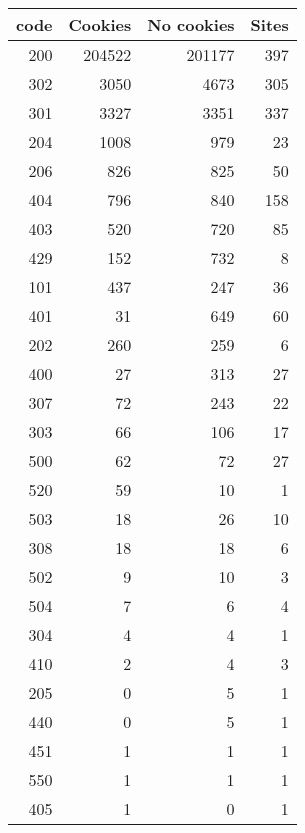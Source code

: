 \begin{tabular}{rrrr}
\toprule
 code &  Cookies &  No cookies &  Sites \\
\midrule
  200 &   204522 &      201177 &    397 \\
  302 &     3050 &        4673 &    305 \\
  301 &     3327 &        3351 &    337 \\
  204 &     1008 &         979 &     23 \\
  206 &      826 &         825 &     50 \\
  404 &      796 &         840 &    158 \\
  403 &      520 &         720 &     85 \\
  429 &      152 &         732 &      8 \\
  101 &      437 &         247 &     36 \\
  401 &       31 &         649 &     60 \\
  202 &      260 &         259 &      6 \\
  400 &       27 &         313 &     27 \\
  307 &       72 &         243 &     22 \\
  303 &       66 &         106 &     17 \\
  500 &       62 &          72 &     27 \\
  520 &       59 &          10 &      1 \\
  503 &       18 &          26 &     10 \\
  308 &       18 &          18 &      6 \\
  502 &        9 &          10 &      3 \\
  504 &        7 &           6 &      4 \\
  304 &        4 &           4 &      1 \\
  410 &        2 &           4 &      3 \\
  205 &        0 &           5 &      1 \\
  440 &        0 &           5 &      1 \\
  451 &        1 &           1 &      1 \\
  550 &        1 &           1 &      1 \\
  405 &        1 &           0 &      1 \\
\bottomrule
\end{tabular}
